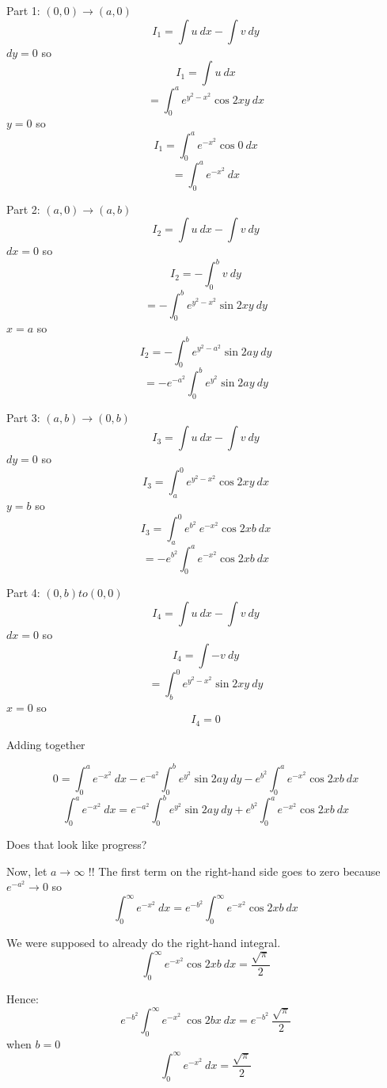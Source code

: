 \documentclass[11pt, oneside]{article}
\begin{document}
Part 1:  $(0,0) \rightarrow (a,0)$
\[ I_1 = \int  u \ dx - \int v \ dy \]
$dy = 0$ so
\[ I_1 = \int u \ dx \]
\[ = \int_0^a e^{y^2 - x^2} \cos 2xy \ dx \]
$y = 0$ so
\[ I_1 = \int_0^a e^{- x^2} \cos 0 \ dx \]
\[ = \int_0^a e^{- x^2} \ dx  \]

Part 2: $(a,0) \rightarrow (a,b)$
\[ I_2 = \int  u \ dx - \int v \ dy \]
$dx = 0$ so
\[ I_2 = - \int_0^b v \ dy \]
\[ = - \int_0^b e^{y^2 - x^2} \sin 2xy \ dy \]
$x = a$ so
\[ I_2 = - \int_0^b e^{y^2 - a^2} \sin 2ay \ dy \]
\[ = - e^{- a^2} \int_0^b e^{y^2} \sin 2ay \ dy \]

Part 3:  $(a,b) \rightarrow (0,b)$
\[ I_3 = \int  u \ dx - \int v \ dy \]
$dy = 0$ so
\[ I_3 = \int_a^0 e^{y^2 - x^2} \cos 2xy \ dx  \]
$y = b$ so
\[ I_3 = \int_a^0 e^{b^2} \ e^{- x^2} \cos 2xb \ dx  \]
\[ = - e^{b^2} \int_0^a e^{- x^2} \cos 2xb \ dx  \]

Part 4: $(0,b) to (0,0)$
\[ I_4 = \int  u \ dx - \int v \ dy \]
$dx = 0$ so
\[ I_4 = \int - v \ dy \]
\[ = \int_b^0 e^{y^2 - x^2} \sin 2xy \ dy \]
$x = 0$ so
\[ I_4 = 0 \]

Adding together

\[ 0 =  \int_0^a e^{- x^2} \ dx - e^{- a^2} \int_0^b e^{y^2} \sin 2ay \ dy  - e^{b^2} \int_0^a e^{- x^2} \cos 2xb \ dx \]
\[  \int_0^a e^{- x^2} \ dx = e^{- a^2} \int_0^b e^{y^2} \sin 2ay \ dy  + e^{b^2} \int_0^a e^{- x^2} \cos 2xb \ dx \]

Does that look like progress?

Now, let $a \rightarrow \infty$ !!  The first term on the right-hand side goes to zero because $e^{-a^2} \rightarrow 0$ so
\[ \int_0^{\infty} e^{- x^2} \ dx = e^{-b^2} \int_0^{\infty} e^{- x^2} \cos 2xb \ dx  \]

We were supposed to already do the right-hand integral.
\[ \int_0^{\infty} e^{- x^2} \cos 2xb \ dx = \frac{\sqrt{\pi}}{2} \]

Hence:
\[ e^{-b^2}  \int_0^{\infty} e^{- x^2} \ \cos 2bx \  dx = e^{-b^2}  \ \frac{\sqrt{\pi}}{2} \]
when $b = 0$
\[ \int_0^{\infty} e^{- x^2} \  dx = \frac{\sqrt{\pi}}{2} \]
\end{document}
